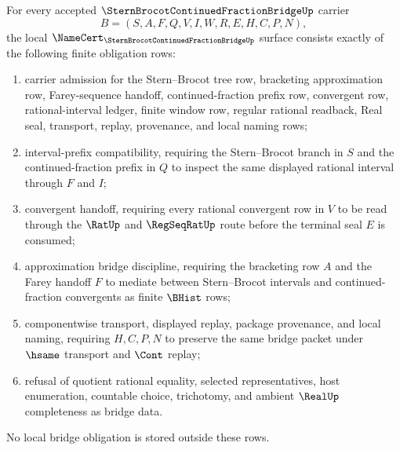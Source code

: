 
\begin{theorem}
\label{thm:stern-brocot-continued-fraction-namecert-obligations}
For every accepted $\SternBrocotContinuedFractionBridgeUp$ carrier
$$
B=(S,A,F,Q,V,I,W,R,E,H,C,P,N),
$$
the local $\NameCert_{\SternBrocotContinuedFractionBridgeUp}$ surface consists exactly of the following finite obligation rows:
\begin{enumerate}
\item carrier admission for the Stern--Brocot tree row, bracketing approximation row, Farey-sequence handoff, continued-fraction prefix row, convergent row, rational-interval ledger, finite window row, regular rational readback, Real seal, transport, replay, provenance, and local naming rows;
\item interval-prefix compatibility, requiring the Stern--Brocot branch in $S$ and the continued-fraction prefix in $Q$ to inspect the same displayed rational interval through $F$ and $I$;
\item convergent handoff, requiring every rational convergent row in $V$ to be read through the $\RatUp$ and $\RegSeqRatUp$ route before the terminal seal $E$ is consumed;
\item approximation bridge discipline, requiring the bracketing row $A$ and the Farey handoff $F$ to mediate between Stern--Brocot intervals and continued-fraction convergents as finite $\BHist$ rows;
\item componentwise transport, displayed replay, package provenance, and local naming, requiring $H,C,P,N$ to preserve the same bridge packet under $\hsame$ transport and $\Cont$ replay;
\item refusal of quotient rational equality, selected representatives, host enumeration, countable choice, trichotomy, and ambient $\RealUp$ completeness as bridge data.
\end{enumerate}
No local bridge obligation is stored outside these rows.
\end{theorem}
